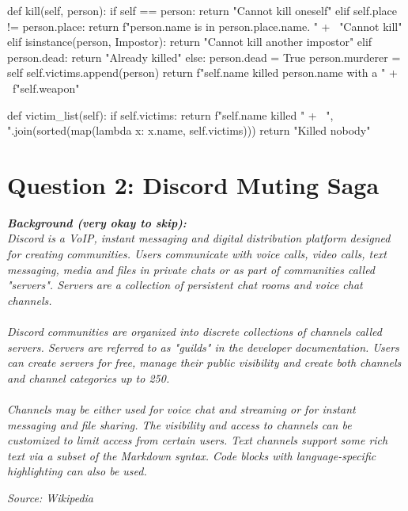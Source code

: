 \begin{python}
    def kill(self, person):
        if self == person:
            return "Cannot kill oneself"
        elif self.place != person.place:
            return f"{person.name} is in {person.place.name}. " + \
                   "Cannot kill"
        elif isinstance(person, Impostor):
            return "Cannot kill another impostor"
        elif person.dead:
            return "Already killed"
        else:
            person.dead = True
            person.murderer = self
            self.victims.append(person)
            return f"{self.name} killed {person.name} with a " + \
                   f"{self.weapon}"

    def victim_list(self):
        if self.victims:
            return f"{self.name} killed " + \
                   ", ".join(sorted(map(lambda x: x.name,
                                        self.victims)))
        return "Killed nobody"
\end{python}

\newpage

\section{Question 2: Discord Muting Saga}
\textbf{\textit{Background (very okay to skip):}} \\
\textit{
Discord is a VoIP, instant messaging and digital distribution platform designed for creating communities. 
Users communicate with voice calls, video calls, text messaging, media and files in private chats or as part 
of communities called "servers". Servers are a collection of persistent chat rooms and voice chat channels. \\ \\
Discord communities are organized into discrete collections of channels called servers. Servers are referred to as 
"guilds" in the developer documentation. Users can create servers for free, manage their public visibility and 
create both channels and channel categories up to 250. \\ \\
Channels may be either used for voice chat and streaming or for instant messaging and file sharing. The visibility 
and access to channels can be customized to limit access from certain users. Text channels support some rich text via 
a subset of the Markdown syntax. Code blocks with language-specific highlighting can also be used.
}
\begin{flushright}
    \textit{Source: Wikipedia}
\end{flushright}

